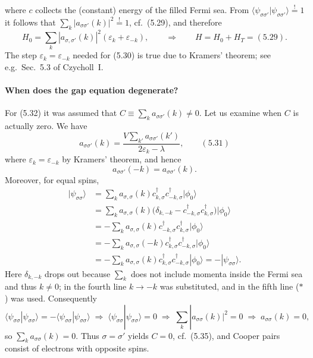 \documentclass[../../main.tex]{subfiles}
\begin{document}
where $c$ collects the (constant) energy of the filled Fermi sea. From
$\langle\psi_{\sigma\sigma'}|\psi_{\sigma\sigma'}\rangle\overset{!}{=}1$ it follows that
$\sum_k|a_{\sigma\sigma'}(k)|^2\overset{!}{=}1$, cf.\ (5.29), and therefore
\begin{equation}
H_0=\sum_k|a_{\sigma,\sigma'}(k)|^2(\varepsilon_k+\varepsilon_{-k}),
\qquad\Longrightarrow\qquad H=H_0+H_T=(5.29).
\end{equation}
The step $\varepsilon_k=\varepsilon_{-k}$ needed for (5.30) is true due to Kramers'
theorem; see e.g.\ Sec.~5.3 of Czycholl~I.

\paragraph{When does the gap equation degenerate?}
For (5.32) it was assumed that $C\equiv\sum_k a_{\sigma\sigma'}(k)\neq0$. Let us examine
when $C$ is actually zero. We have
\begin{equation}
a_{\sigma\sigma'}(k)=\frac{V\sum_{k'}a_{\sigma\sigma'}(k')}{2\varepsilon_k-\lambda},
\qquad (5.31)
\end{equation}
where $\varepsilon_k=\varepsilon_{-k}$ by Kramers' theorem, and hence
\begin{equation}
a_{\sigma\sigma'}(-k)=a_{\sigma\sigma'}(k). \tag{$\ast$}
\end{equation}
Moreover, for equal spins,
\begin{align}
|\psi_{\sigma\sigma}\rangle
&=\sum_k a_{\sigma,\sigma}(k)c^\dagger_{k,\sigma}c^\dagger_{-k,\sigma}|\phi_0\rangle\\
&=\sum_k a_{\sigma,\sigma}(k)\big(\delta_{k,-k}
  -c^\dagger_{-k,\sigma}c^\dagger_{k,\sigma}\big)|\phi_0\rangle\\
&=-\sum_k a_{\sigma,\sigma}(k)c^\dagger_{-k,\sigma}c^\dagger_{k,\sigma}|\phi_0\rangle\\
&=-\sum_k a_{\sigma,\sigma}(-k)c^\dagger_{k,\sigma}c^\dagger_{-k,\sigma}|\phi_0\rangle\\
&=-\sum_k a_{\sigma,\sigma}(k)c^\dagger_{k,\sigma}c^\dagger_{-k,\sigma}|\phi_0\rangle
 =-|\psi_{\sigma\sigma}\rangle .
\end{align}
Here $\delta_{k,-k}$ drops out because $\sum_k$ does not include momenta inside the Fermi
sea and thus $k\neq0$; in the fourth line $k\to-k$ was substituted, and in the fifth line
($\ast$) was used. Consequently
\begin{equation}
\langle\psi_{\sigma\sigma}|\psi_{\sigma\sigma}\rangle
=-\langle\psi_{\sigma\sigma}|\psi_{\sigma\sigma}\rangle
\;\Longrightarrow\;\langle\psi_{\sigma\sigma}|\psi_{\sigma\sigma}\rangle=0
\;\Longrightarrow\;\sum_k|a_{\sigma\sigma}(k)|^2=0
\;\Longrightarrow\;a_{\sigma\sigma}(k)=0,
\end{equation}
so $\sum_k a_{\sigma\sigma}(k)=0$. Thus $\sigma=\sigma'$ yields $C=0$, cf.\ (5.35), and
Cooper pairs consist of electrons with opposite spins.
\end{document}
